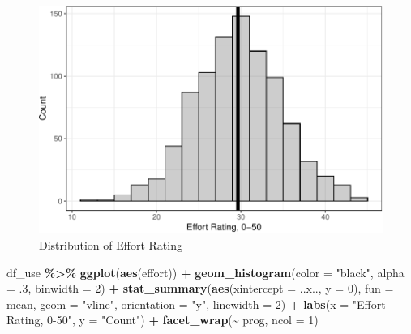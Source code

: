 \documentclass[
]{article}
\newenvironment{Shaded}{\begin{snugshade}}{\end{snugshade}}
\newcommand{\AttributeTok}[1]{\textcolor[rgb]{0.13,0.29,0.53}{#1}}
\newcommand{\DecValTok}[1]{\textcolor[rgb]{0.00,0.00,0.81}{#1}}
\newcommand{\FunctionTok}[1]{\textcolor[rgb]{0.13,0.29,0.53}{\textbf{#1}}}
\newcommand{\NormalTok}[1]{#1}
\newcommand{\SpecialCharTok}[1]{\textcolor[rgb]{0.81,0.36,0.00}{\textbf{#1}}}
\newcommand{\StringTok}[1]{\textcolor[rgb]{0.31,0.60,0.02}{#1}}
\begin{document}
\begin{figure}[hb]

\includegraphics{Appendix_ex_weightloss_files/figure-latex/unnamed-chunk-51-1} \hfill{}

\caption{Distribution of Effort Rating}\label{fig:unnamed-chunk-51}
\end{figure}

\clearpage

\begin{Shaded}
\begin{Highlighting}[]
\NormalTok{df\_use }\SpecialCharTok{\%\textgreater{}\%} 
  \FunctionTok{ggplot}\NormalTok{(}\FunctionTok{aes}\NormalTok{(effort)) }\SpecialCharTok{+} 
  \FunctionTok{geom\_histogram}\NormalTok{(}\AttributeTok{color =} \StringTok{"black"}\NormalTok{,}
                 \AttributeTok{alpha =}\NormalTok{ .}\DecValTok{3}\NormalTok{,}
                 \AttributeTok{binwidth =} \DecValTok{2}\NormalTok{) }\SpecialCharTok{+}
  \FunctionTok{stat\_summary}\NormalTok{(}\FunctionTok{aes}\NormalTok{(}\AttributeTok{xintercept =}\NormalTok{ ..x.., }\AttributeTok{y =} \DecValTok{0}\NormalTok{),}
               \AttributeTok{fun =}\NormalTok{ mean,}
               \AttributeTok{geom =} \StringTok{"vline"}\NormalTok{,}
               \AttributeTok{orientation =} \StringTok{"y"}\NormalTok{,}
               \AttributeTok{linewidth =} \DecValTok{2}\NormalTok{) }\SpecialCharTok{+}
  \FunctionTok{labs}\NormalTok{(}\AttributeTok{x =} \StringTok{"Effort Rating, 0{-}50"}\NormalTok{,}
       \AttributeTok{y =} \StringTok{"Count"}\NormalTok{) }\SpecialCharTok{+}
  \FunctionTok{facet\_wrap}\NormalTok{(}\SpecialCharTok{\textasciitilde{}}\NormalTok{ prog, }\AttributeTok{ncol =} \DecValTok{1}\NormalTok{)}
\end{Highlighting}
\end{Shaded}
\end{document}
